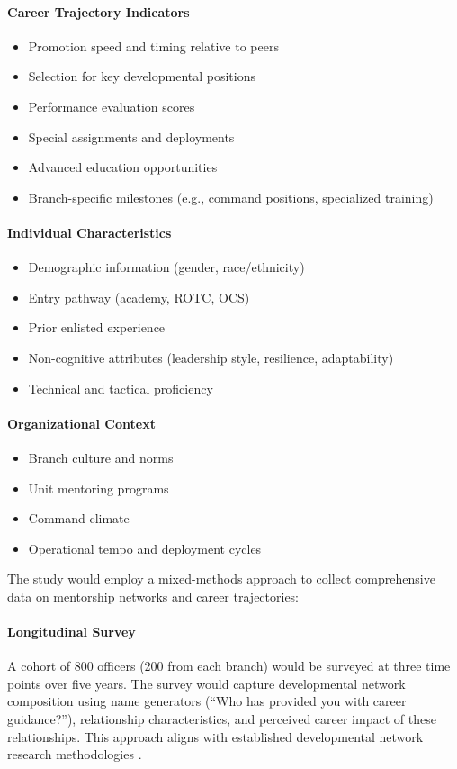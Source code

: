 \documentclass[main.tex]{subfiles}
\begin{document}
\paragraph{Career Trajectory Indicators}
\begin{itemize}
\item Promotion speed and timing relative to peers
\item Selection for key developmental positions
\item Performance evaluation scores
\item Special assignments and deployments
\item Advanced education opportunities
\item Branch-specific milestones (e.g., command positions, specialized training)
\end{itemize}

\paragraph{Individual Characteristics}
\begin{itemize}
\item Demographic information (gender, race/ethnicity)
\item Entry pathway (academy, ROTC, OCS)
\item Prior enlisted experience
\item Non-cognitive attributes (leadership style, resilience, adaptability)
\item Technical and tactical proficiency
\end{itemize}

\paragraph{Organizational Context}
\begin{itemize}
\item Branch culture and norms
\item Unit mentoring programs
\item Command climate
\item Operational tempo and deployment cycles
\end{itemize}


The study would employ a mixed-methods approach to collect comprehensive data on mentorship networks and career trajectories:

\paragraph{Longitudinal Survey} A cohort of 800 officers (200 from each branch) would be surveyed at three time points over five years. The survey would capture developmental network composition using name generators (``Who has provided you with career guidance?''), relationship characteristics, and perceived career impact of these relationships. This approach aligns with established developmental network research methodologies \cite{higgins2023celebrating, cdc2015network}.
\end{document}
